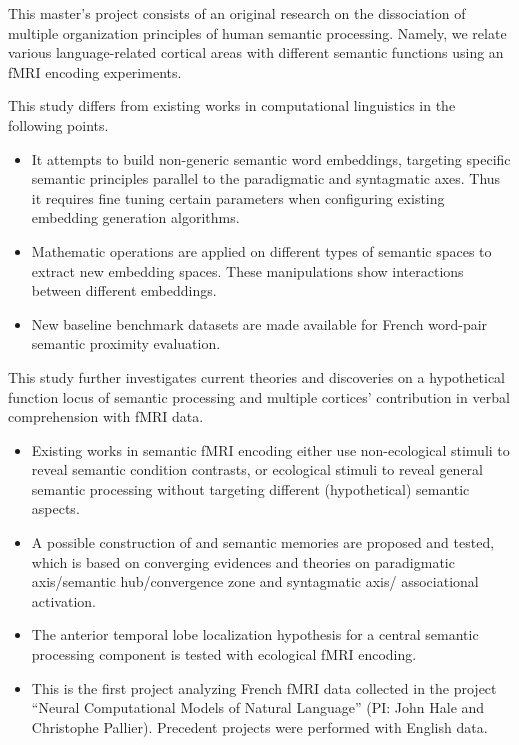 \begin{declarationauthorship}
    \noindent This master's project consists of an original research on the dissociation of multiple organization principles of human semantic processing. Namely, we relate various language-related cortical areas with different semantic functions using an fMRI encoding experiments. 
    
    This study differs from existing works in computational linguistics in the following points.
    \begin{itemize}
    \item It attempts to build non-generic semantic word embeddings, targeting specific semantic principles parallel to the paradigmatic and syntagmatic axes. Thus it requires fine tuning certain parameters when configuring existing embedding generation algorithms.
    \item Mathematic operations are applied on different types of semantic spaces to extract new embedding spaces. These manipulations show interactions between different embeddings.
    \item New baseline benchmark datasets are made available for French word-pair semantic proximity evaluation.
    \end{itemize}
    
    This study further investigates current theories and discoveries on a hypothetical function locus of semantic processing and multiple cortices' contribution in verbal comprehension with fMRI data.
    \begin{itemize}
    \item Existing works in semantic fMRI encoding either use non-ecological stimuli to reveal semantic condition contrasts, or ecological stimuli to reveal general semantic processing without targeting different (hypothetical) semantic aspects.
    \item A possible construction of \similarity and \association semantic memories are proposed and tested, which is based on converging evidences and theories on paradigmatic axis/semantic hub/convergence zone and syntagmatic axis/ associational activation.
    \item The anterior temporal lobe localization hypothesis for a central semantic processing component is tested with ecological fMRI encoding.
    \item This is the first project analyzing French fMRI data collected in the project ``Neural Computational Models of Natural Language'' (PI: John Hale and Christophe Pallier). Precedent projects were performed with English data.
    \end{itemize}
    

\end{declarationauthorship}
